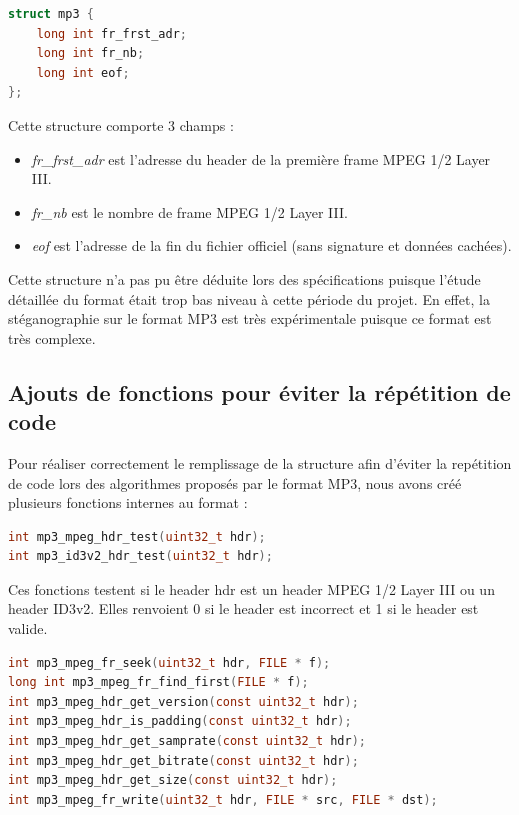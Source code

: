 \documentclass[11pt]{article}
\begin{document}
\begin{lstlisting}[language=c]
struct mp3 {
    long int fr_frst_adr; 
    long int fr_nb;       
    long int eof;      
};
\end{lstlisting}

Cette structure comporte 3 champs : 
\begin{itemize}
\item \textit{fr\_frst\_adr} est l'adresse du header de la première frame 
MPEG 1/2 Layer III. 
\item \textit{fr\_nb} est le nombre de frame MPEG 1/2 Layer III.
\item \textit{eof} est l'adresse de la fin du fichier officiel (sans signature et données cachées).
\end{itemize}

Cette structure n'a pas pu être déduite lors des spécifications puisque 
l'étude détaillée du format était trop bas niveau à cette période du projet. 
En effet, la stéganographie sur le format MP3 est très expérimentale puisque 
ce format est très complexe. 

\subsection{Ajouts de fonctions pour éviter la répétition de code}

Pour réaliser correctement le remplissage de la structure afin d'éviter la
repétition de code lors des algorithmes proposés par le format MP3, 
nous avons créé plusieurs fonctions internes au format : 

\begin{lstlisting}[language=c]
int mp3_mpeg_hdr_test(uint32_t hdr);
int mp3_id3v2_hdr_test(uint32_t hdr);
\end{lstlisting}

Ces fonctions testent si le header hdr est un header MPEG 1/2 Layer III
ou un header ID3v2.
Elles renvoient 0 si le header est incorrect et 1 si le header est valide. 
\newline

\begin{lstlisting}[language=c]
int mp3_mpeg_fr_seek(uint32_t hdr, FILE * f);
long int mp3_mpeg_fr_find_first(FILE * f);
int mp3_mpeg_hdr_get_version(const uint32_t hdr);
int mp3_mpeg_hdr_is_padding(const uint32_t hdr);
int mp3_mpeg_hdr_get_samprate(const uint32_t hdr);
int mp3_mpeg_hdr_get_bitrate(const uint32_t hdr);
int mp3_mpeg_hdr_get_size(const uint32_t hdr);
int mp3_mpeg_fr_write(uint32_t hdr, FILE * src, FILE * dst);
\end{lstlisting}
\end{document}
